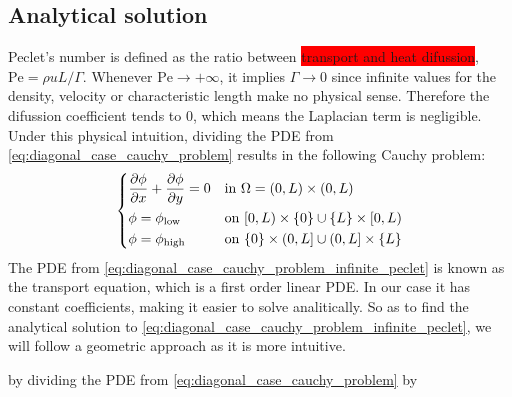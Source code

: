 
\subsection{Analytical solution}

Peclet's number is defined as the ratio between \colorbox{red}{transport and heat difussion}, $\mathrm{Pe} = \rho u L / \Gamma$. Whenever $\mathrm{Pe} \to +\infty$, it implies $\Gamma \to 0$ since infinite values for the density, velocity or characteristic length make no physical sense. Therefore the difussion coefficient tends to $0$, which means the Laplacian term is negligible. Under this physical intuition, dividing the PDE from \eqref{eq:diagonal_case_cauchy_problem} results in the following Cauchy problem:
\begin{equation} \label{eq:diagonal_case_cauchy_problem_infinite_peclet}
	\left\{
	\begin{aligned}
		&\pdv{\phi}{x} + \pdv{\phi}{y} = 0 &
		&\text{in } \Omega = (0,L) \times (0,L) \\
		&\phi = \phi_\text{low} &
		&\text{on } [0,L) \times \{ 0 \} \cup \{ L \} \times [0,L) \\
		&\phi = \phi_\text{high} &
		&\text{on } \{ 0 \} \times (0,L] \cup (0,L] \times \{ L \}
	\end{aligned}
	\right.
\end{equation}
The PDE from \eqref{eq:diagonal_case_cauchy_problem_infinite_peclet} is known as the transport equation, which is a first order linear PDE. In our case it has constant coefficients, making it easier to solve analitically. So as to find the analytical solution to \eqref{eq:diagonal_case_cauchy_problem_infinite_peclet}, we will follow a geometric approach as it is more intuitive. 

by dividing the PDE from \eqref{eq:diagonal_case_cauchy_problem} by 
